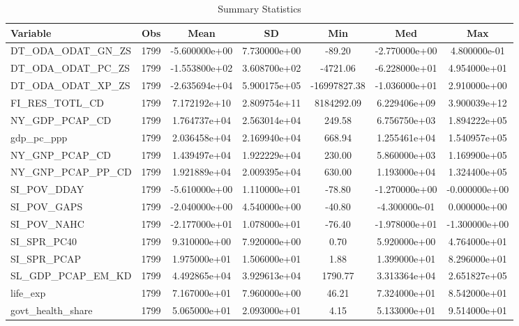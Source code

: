 \begin{table}
\centering
\caption{Summary Statistics}
\label{Sum_Stats}
\begin{tabular}{lcccccc}
\toprule
         Variable &  Obs &          Mean &           SD &          Min &           Med &           Max \\
\midrule
DT\_ODA\_ODAT\_GN\_ZS & 1799 & -5.600000e+00 & 7.730000e+00 & -89.20 & -2.770000e+00 & 4.800000e-01 \\
DT\_ODA\_ODAT\_PC\_ZS & 1799 & -1.553800e+02 & 3.608700e+02 & -4721.06 & -6.228000e+01 & 4.954000e+01 \\
DT\_ODA\_ODAT\_XP\_ZS & 1799 & -2.635694e+04 & 5.900175e+05 & -16997827.38 & -1.036000e+01 & 2.910000e+00 \\
FI\_RES\_TOTL\_CD & 1799 & 7.172192e+10 & 2.809754e+11 & 8184292.09 & 6.229406e+09 & 3.900039e+12 \\
NY\_GDP\_PCAP\_CD & 1799 & 1.764737e+04 & 2.563014e+04 & 249.58 & 6.756750e+03 & 1.894222e+05 \\
gdp\_pc\_ppp & 1799 & 2.036458e+04 & 2.169940e+04 & 668.94 & 1.255461e+04 & 1.540957e+05 \\
NY\_GNP\_PCAP\_CD & 1799 & 1.439497e+04 & 1.922229e+04 & 230.00 & 5.860000e+03 & 1.169900e+05 \\
NY\_GNP\_PCAP\_PP\_CD & 1799 & 1.921889e+04 & 2.009395e+04 & 630.00 & 1.193000e+04 & 1.324400e+05 \\
SI\_POV\_DDAY & 1799 & -5.610000e+00 & 1.110000e+01 & -78.80 & -1.270000e+00 & -0.000000e+00 \\
SI\_POV\_GAPS & 1799 & -2.040000e+00 & 4.540000e+00 & -40.80 & -4.300000e-01 & 0.000000e+00 \\
SI\_POV\_NAHC & 1799 & -2.177000e+01 & 1.078000e+01 & -76.40 & -1.978000e+01 & -1.300000e+00 \\
SI\_SPR\_PC40 & 1799 & 9.310000e+00 & 7.920000e+00 & 0.70 & 5.920000e+00 & 4.764000e+01 \\
SI\_SPR\_PCAP & 1799 & 1.975000e+01 & 1.506000e+01 & 1.88 & 1.399000e+01 & 8.296000e+01 \\
SL\_GDP\_PCAP\_EM\_KD & 1799 & 4.492865e+04 & 3.929613e+04 & 1790.77 & 3.313364e+04 & 2.651827e+05 \\
life\_exp & 1799 & 7.167000e+01 & 7.960000e+00 & 46.21 & 7.324000e+01 & 8.542000e+01 \\
govt\_health\_share & 1799 & 5.065000e+01 & 2.093000e+01 & 4.15 & 5.133000e+01 & 9.514000e+01 \\
\bottomrule
\end{tabular}
\end{table}
